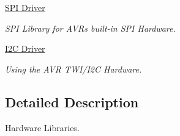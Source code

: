 \begin{DoxyCompactItemize}
\hyperlink{group__spi}{S\-P\-I Driver}
\begin{DoxyCompactList}\small\item\em S\-P\-I Library for A\-V\-Rs built-\/in S\-P\-I Hardware. \end{DoxyCompactList}\item 
\hyperlink{group__twi}{I2\-C Driver}
\begin{DoxyCompactList}\small\item\em Using the A\-V\-R T\-W\-I/\-I2\-C Hardware. \end{DoxyCompactList}\end{DoxyCompactItemize}


\subsection{Detailed Description}
Hardware Libraries. 